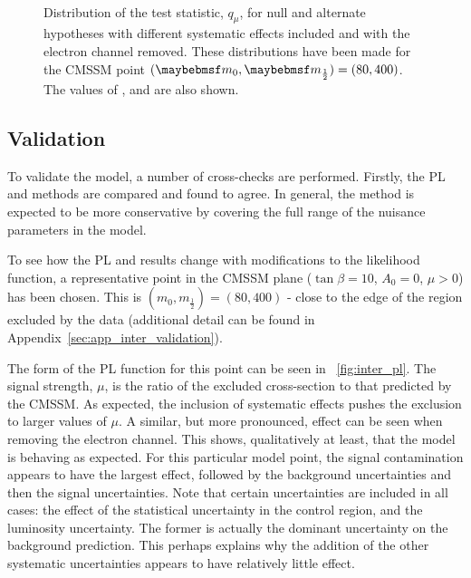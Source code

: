 \begin{figure}
\centering
{}
\\
\caption[Distributions of the test statistic, $q_{\mu}$]{Distribution of the
  test statistic, $q_{\mu}$, for null and alternate hypotheses with different
  systematic effects included and with the electron channel removed. These
  distributions have been made for the \ac{CMSSM} point $(\Mzero, \Mhalf) = (80,
  400)$. The values of \CLb, \CLspb and \CLs are also shown.}
\label{fig:inter_cls}
\end{figure}

\subsection{Validation}
\label{sec:inter_validation}
To validate the model, a number of cross-checks are performed. Firstly, the
\ac{PL} and \CLs methods are compared and found to agree. In general, the \CLs
method is expected to be more conservative by covering the full range of the
nuisance parameters in the model.

To see how the \ac{PL} and \CLs results change with modifications to the
likelihood function, a representative point in the \ac{CMSSM} plane
($\tan\beta=10$, $A_0=0$, $\mu>0$) has been chosen. This is $(m_0,
m_{\frac{1}{2}}) = (80, 400)$ - close to the edge of the region excluded by the
data (additional detail can be found in
Appendix~\ref{sec:app_inter_validation}).

The form of the \ac{PL} function for this point can be seen in
\fig~\ref{fig:inter_pl}. The signal strength, $\mu$, is the ratio of the
excluded cross-section to that predicted by the \ac{CMSSM}. As expected, the
inclusion of systematic effects pushes the exclusion to larger values of
$\mu$. A similar, but more pronounced, effect can be seen when removing the
electron channel. This shows, qualitatively at least, that the model is behaving
as expected. For this particular model point, the signal contamination appears
to have the largest effect, followed by the background uncertainties and then
the signal uncertainties. Note that certain uncertainties are included in all
cases: the effect of the statistical uncertainty in the control region, and the
luminosity uncertainty. The former is actually the dominant uncertainty on the
background prediction. This perhaps explains why the addition of the other
systematic uncertainties appears to have relatively little effect.


